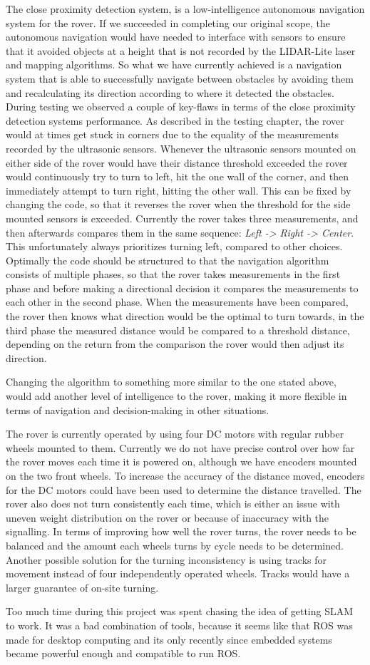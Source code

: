 The close proximity detection system, is a low-intelligence autonomous navigation system for the rover. If we succeeded in completing our original scope, the autonomous navigation would have needed to interface with sensors to ensure that it avoided objects at a height that is not recorded by the LIDAR-Lite laser and mapping algorithms. So what we have currently achieved is a navigation system that is able to successfully navigate between obstacles by avoiding them and recalculating its direction according to where it detected the obstacles.\\

During testing we observed a couple of key-flaws in terms of the close proximity detection systems performance.
As described in the testing chapter, the rover would at times get stuck in corners due to the equality of the measurements recorded by the ultrasonic sensors. Whenever the ultrasonic sensors mounted on either side of the rover would have their distance threshold exceeded the rover would continuously try to turn to left, hit the one wall of the corner, and then immediately attempt to turn right, hitting the other wall. This can be fixed by changing the code, so that it reverses the rover when the threshold for the side mounted sensors is exceeded. Currently the rover takes three measurements, and then afterwards compares them in the same sequence: \textit{Left -> Right -> Center}. This unfortunately always prioritizes turning left, compared to other choices. Optimally the code should be structured to that the navigation algorithm consists of multiple phases, so that the rover takes measurements in the first phase and before making a directional decision it compares the measurements to each other in the second phase. When the measurements have been compared, the rover then knows what direction would be the optimal to turn towards, in the third phase the measured distance would be compared to a threshold distance, depending on the return from the comparison the rover would then adjust its direction.

Changing the algorithm to something more similar to the one stated above, would add another level of intelligence to the rover, making it more flexible in terms of navigation and decision-making in other situations.

The rover is currently operated by using four DC motors with regular rubber wheels mounted to them. Currently we do not have precise control over how far the rover moves each time it is powered on, although we have encoders mounted on the two front wheels. To increase the accuracy of the distance moved, encoders for the DC motors could have been used to determine the distance travelled. The rover also does not turn consistently each time, which is either an issue with uneven weight distribution on the rover or because of inaccuracy with the signalling. In terms of improving how well the rover turns, the rover needs to be balanced and the amount each wheels turns by cycle needs to be determined. Another possible solution for the turning inconsistency is using tracks for movement instead of four independently operated wheels. Tracks would have a larger guarantee of on-site turning.

Too much time during this project was spent chasing the idea of getting SLAM to work. It was a bad combination of tools, because it seems like that ROS was made for desktop computing and its only recently since embedded systems became powerful enough and compatible to run ROS.
